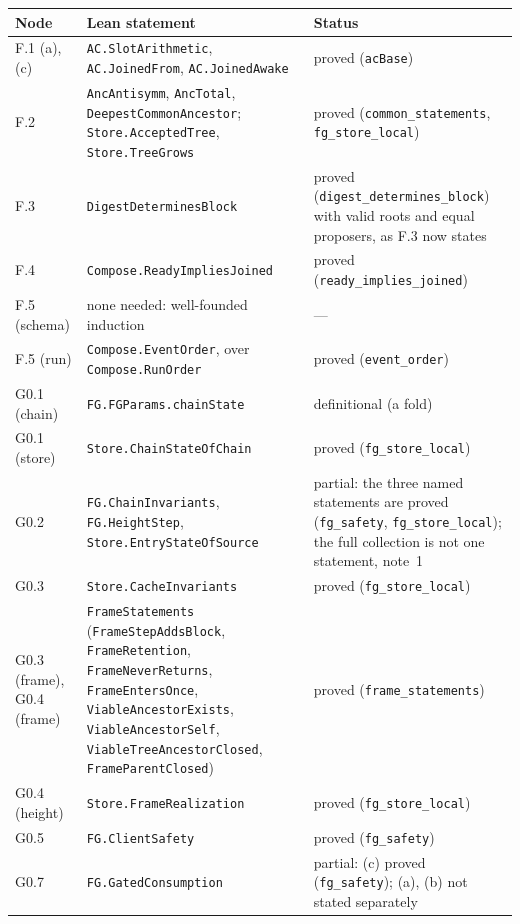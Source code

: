 \documentclass{article}
\begin{document}
{\footnotesize
\begin{longtable}{@{}>{\raggedright\arraybackslash}p{1.6cm}>{\raggedright\arraybackslash}p{6.2cm}>{\raggedright\arraybackslash}p{5.2cm}@{}}
\hline
Node & Lean statement & Status\\
\hline
\endhead
F.1 (a), (c) & \texttt{AC.SlotArithmetic}, \texttt{AC.JoinedFrom},
  \texttt{AC.JoinedAwake} & proved (\texttt{acBase})\\
F.2 & \texttt{AncAntisymm}, \texttt{AncTotal},
  \texttt{DeepestCommonAncestor}; \texttt{Store.AcceptedTree},
  \texttt{Store.TreeGrows} & proved (\texttt{common\_statements},
  \texttt{fg\_store\_local})\\
F.3 & \texttt{DigestDeterminesBlock} & proved
  (\texttt{digest\_determines\_block}) with valid roots and equal
  proposers, as F.3 now states\\
F.4 & \texttt{Compose.ReadyImpliesJoined} & proved (\texttt{ready\_implies\_joined})\\
F.5 (schema) & none needed: well-founded induction & ---\\
F.5 (run) & \texttt{Compose.EventOrder}, over \texttt{Compose.RunOrder} &
  proved (\texttt{event\_order})\\
G0.1 (chain) & \texttt{FG.FGParams.chainState} & definitional (a fold)\\
G0.1 (store) & \texttt{Store.ChainStateOfChain} & proved
  (\texttt{fg\_store\_local})\\
G0.2 & \texttt{FG.ChainInvariants}, \texttt{FG.HeightStep},
  \texttt{Store.EntryStateOfSource} & partial: the three named statements
  are proved (\texttt{fg\_safety}, \texttt{fg\_store\_local}); the full
  collection is not one statement, note~1\\
G0.3 & \texttt{Store.CacheInvariants} & proved (\texttt{fg\_store\_local})\\
G0.3 (frame), G0.4 (frame) & \texttt{FrameStatements} (\texttt{FrameStepAddsBlock},
  \texttt{FrameRetention}, \texttt{FrameNeverReturns},
  \texttt{FrameEntersOnce}, \texttt{ViableAncestorExists},
  \texttt{ViableAncestorSelf}, \texttt{ViableTreeAncestorClosed},
  \texttt{FrameParentClosed}) & proved (\texttt{frame\_statements})\\
G0.4 (height) & \texttt{Store.FrameRealization} & proved
  (\texttt{fg\_store\_local})\\
G0.5 & \texttt{FG.ClientSafety} & proved (\texttt{fg\_safety})\\
G0.7 & \texttt{FG.GatedConsumption} & partial: (c) proved
  (\texttt{fg\_safety}); (a), (b) not stated separately\\

\end{longtable}}
\end{document}
